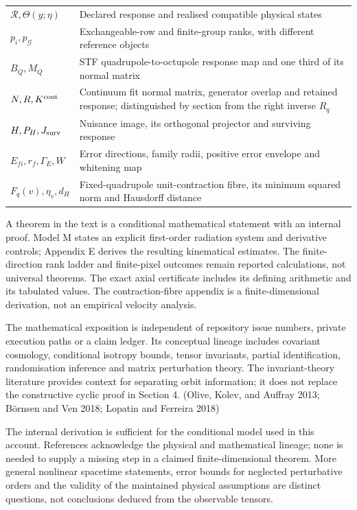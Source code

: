 \documentclass[
  11pt,
  a4paper]{article}
\begin{document}
\begin{longtable}[]{@{}
  >{\raggedright\arraybackslash}p{}
  >{\raggedright\arraybackslash}p{}@{}}
\(\mathcal R,\Theta(y;\eta)\) & Declared response and realised compatible physical states \\
\(p_i,p_{\mathcal G}\) & Exchangeable-row and finite-group ranks, with different reference objects \\
\(B_Q,M_Q\) & STF quadrupole-to-octupole response map and one third of its normal matrix \\
\(N,R,K^{\rm cont}\) & Continuum fit normal matrix, generator overlap and retained response; distinguished by section from the right inverse \(R_q\) \\
\(H, P_H, J_{\rm surv}\) & Nuisance image, its orthogonal projector and surviving response \\
\(E_{fi},r_f,\Gamma_E,W\) & Error directions, family radii, positive error envelope and whitening map \\
\(F_q(v),\eta_v,d_H\) & Fixed-quadrupole unit-contraction fibre, its minimum squared norm and Hausdorff distance \\
\end{longtable}

A theorem in the text is a conditional mathematical statement with an internal proof. Model M states an explicit first-order radiation system and derivative controls; Appendix E derives the resulting kinematical estimates. The finite-direction rank ladder and finite-pixel outcomes remain reported calculations, not universal theorems. The exact axial certificate includes its defining arithmetic and its tabulated values. The contraction-fibre appendix is a finite-dimensional derivation, not an empirical velocity analysis.

The mathematical exposition is independent of repository issue numbers, private execution paths or a claim ledger. Its conceptual lineage includes covariant cosmology, conditional isotropy bounds, tensor invariants, partial identification, randomisation inference and matrix perturbation theory. The invariant-theory literature provides context for separating orbit information; it does not replace the constructive cyclic proof in Section 4. (Olive, Kolev, and Auffray 2013; Börnsen and Ven 2018; Lopatin and Ferreira 2018)

The internal derivation is sufficient for the conditional model used in this account. References acknowledge the physical and mathematical lineage; none is needed to supply a missing step in a claimed finite-dimensional theorem. More general nonlinear spacetime statements, error bounds for neglected perturbative orders and the validity of the maintained physical assumptions are distinct questions, not conclusions deduced from the observable tensors.
\end{document}
